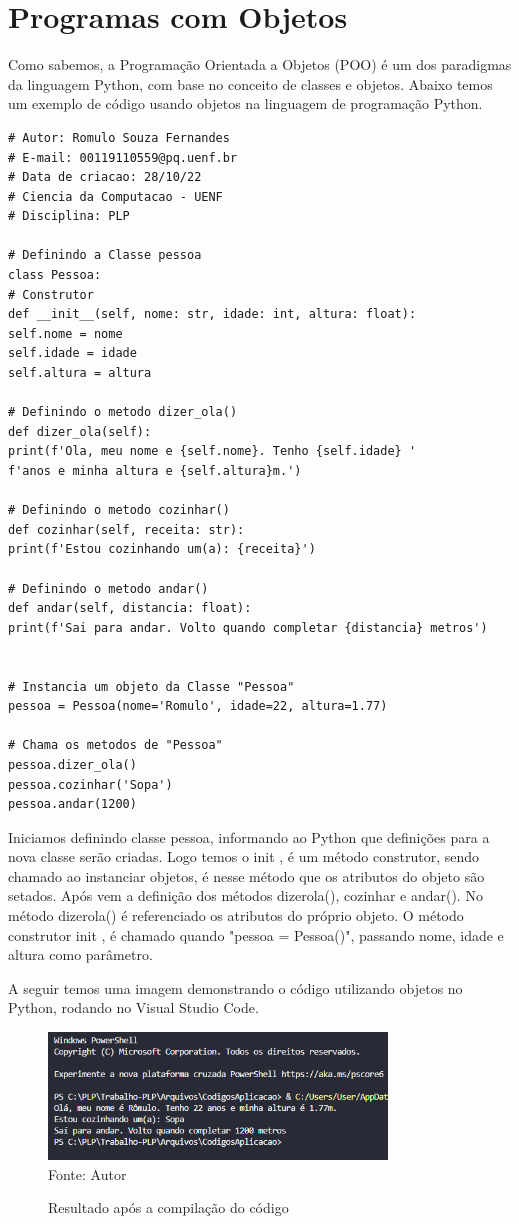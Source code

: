     \section{Programas com Objetos}
    Como sabemos, a Programação Orientada a Objetos (POO) é um dos paradigmas da linguagem
    Python, com base no conceito de classes e objetos. Abaixo temos um exemplo de código usando objetos na linguagem de programação Python.
\begin{lstlisting}
# Autor: Romulo Souza Fernandes
# E-mail: 00119110559@pq.uenf.br
# Data de criacao: 28/10/22
# Ciencia da Computacao - UENF
# Disciplina: PLP

# Definindo a Classe pessoa
class Pessoa:
# Construtor
def __init__(self, nome: str, idade: int, altura: float):
self.nome = nome
self.idade = idade
self.altura = altura

# Definindo o metodo dizer_ola()
def dizer_ola(self):
print(f'Ola, meu nome e {self.nome}. Tenho {self.idade} '
f'anos e minha altura e {self.altura}m.')

# Definindo o metodo cozinhar()
def cozinhar(self, receita: str):
print(f'Estou cozinhando um(a): {receita}')

# Definindo o metodo andar()
def andar(self, distancia: float):
print(f'Sai para andar. Volto quando completar {distancia} metros')


# Instancia um objeto da Classe "Pessoa"
pessoa = Pessoa(nome='Romulo', idade=22, altura=1.77)

# Chama os metodos de "Pessoa"
pessoa.dizer_ola()
pessoa.cozinhar('Sopa')
pessoa.andar(1200)
\end{lstlisting}
	Iniciamos definindo classe pessoa, informando ao Python que definições para a nova classe serão criadas. Logo temos o \textunderscore\textunderscore init \textunderscore\textunderscore, é um método construtor, sendo chamado ao instanciar objetos, é nesse método que os atributos do objeto são setados. Após vem a definição dos métodos dizer\textunderscore ola(), cozinhar e andar(). No método dizer\textunderscore ola() é referenciado os atributos do próprio objeto. O método construtor \textunderscore\textunderscore init \textunderscore\textunderscore, é chamado quando "pessoa = Pessoa()", passando nome, idade e altura como parâmetro.
	
	A seguir temos uma imagem demonstrando o código utilizando objetos no Python, rodando no Visual Studio Code.
    \begin{figure}[H]
    	\begin{center}
    		\caption{Resultado após a compilação do código} \label{ling1}
    		\includegraphics[width=9cm]{objetos.png} \\
    		{\tiny \sf Fonte:{ Autor}}
    	\end{center}
    \end{figure}
    
